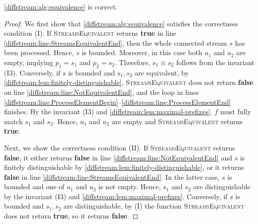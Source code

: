 \begin{theorem}
  \label{diffstream:thm:correctness}
  \cref{diffstream:alg:equivalence} is correct.
\end{theorem}

\begin{proof}
  We first show that \cref{diffstream:alg:equivalence} satisfies the correctness
  condition (I). If
  \textsc{StreamsEquivalent} returns \textbf{true} in line \ref{diffstream:line:StreamsEquivalentEnd}, then
  the whole connected stream $s$ has been processed. Hence, $s$ is bounded.
  Moreover, in this case both $u_1$ and $u_2$
  are empty, implying $p_1=s_1$ and $p_2=s_2$. Therefore, $s_1\equiv s_2$ follows from the invariant (I3).
  Conversely, if $s$ is bounded and $s_1,s_2$ are equivalent, by
  \cref{diffstream:lem:finitely-distinguishable},
  \textsc{StreamsEquivalent} does not
  return \textbf{false} on line \ref{diffstream:line:NotEquivalentEnd}, and the loop in lines
  \ref{diffstream:line:ProcessElementBegin}--\ref{diffstream:line:ProcessElementEnd} finishes. By the invariant (I3) and \cref{diffstream:lem:maximal-prefixes}, $f$ must fully
  match $s_1$ and $s_2$. Hence, $u_1$ and $u_2$ are empty and
  \textsc{StreamsEquivalent} returns \textbf{true}.

  Next, we show the correctness condition (II).
  If \textsc{StreamsEquivalent} returns \textbf{false}, it either returns \textbf{false} in line \ref{diffstream:line:NotEquivalentEnd} and $s$ is finitely
  distinguishable by \cref{diffstream:lem:finitely-distinguishable}, or it returns \textbf{false} in line \ref{diffstream:line:StreamsEquivalentEnd}. In the latter case, $s$ is bounded and one of $u_1$ and $u_2$ is not empty. Hence, $s_1$ and $s_2$ are distinguishable by the invariant (I3) and \cref{diffstream:lem:maximal-prefixes}.
  Conversely, if $s$ is bounded and $s_1,s_2$ are distinguishable, by (I)
  the function \textsc{StreamsEquivalent} does not return \textbf{true},
  so it returns \textbf{false}.


\end{proof}
